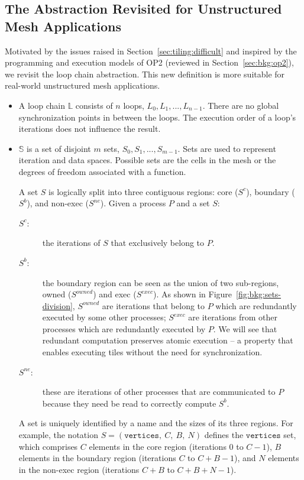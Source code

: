 \subsection{The Abstraction Revisited for Unstructured Mesh Applications}
\label{sec:tiling:lc-unstruct}
Motivated by the issues raised in Section~\ref{sec:tiling:difficult} and inspired by the programming and execution models of OP2 (reviewed in Section~\ref{sec:bkg:op2}), we revisit the loop chain abstraction. This new definition is more suitable for real-world unstructured mesh applications.

\begin{itemize}
\item A loop chain $\mathbb{L}$ consists of $n$ loops, $L_0, L_1, ..., L_{n-1}$. There are no global synchronization points in between the loops. The execution order of a loop's iterations does not influence the result. 

\item $\mathbb{S}$ is a set of disjoint $m$ sets, $S_0, S_1, ..., S_{m-1}$. Sets are used to represent iteration and data spaces. Possible sets are the cells in the mesh or the degrees of freedom associated with a function.  

A set $S$ is logically split into three contiguous regions: core ($S^{c}$), boundary ($S^{b}$), and non-exec ($S^{ne}$). Given a process $P$ and a set $S$:
\begin{description}
 \item[$S^{c}$:] the iterations of $S$ that exclusively belong to $P$.
 \item[$S^{b}$:] the boundary region can be seen as the union of two sub-regions, owned ($S^{owned}$) and exec ($S^{exec}$). As shown in Figure~\ref{fig:bkg:sets-division}, $S^{owned}$ are iterations that belong to $P$ which are redundantly executed by some other processes; $S^{exec}$ are iterations from other processes which are redundantly executed by $P$. We will see that redundant computation preserves atomic execution -- a property that enables executing tiles without the need for synchronization.
  \item[$S^{ne}$:] these are iterations of other processes that are communicated to $P$ because they need be read to correctly compute $S^{b}$.
 \end{description} 
 
A set is uniquely identified by a name and the sizes of its three regions. For example, the notation $S = (\texttt{vertices},\ C,\ B,\ N)$ defines the $\texttt{vertices}$ set, which comprises $C$ elements in the core region (iterations $0$ to $C-1$), $B$ elements in the boundary region (iterations $C$ to $C+B-1$), and $N$ elements in the non-exec region (iterations $C+B$ to $C+B+N-1$).


\end{itemize}
